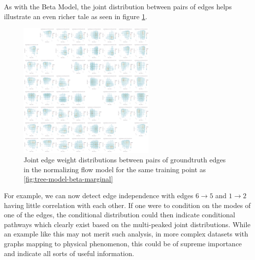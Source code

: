 As with the Beta Model, the joint distribution between pairs of edges helps illustrate an even richer tale as seen in figure \ref{fig:tree-model-dnfg-joint}.
\begin{figure}[htb]
	\centering
	\includegraphics[width=0.6\textwidth]{images/tree-model-dnfg-joint.pdf}
	\caption{Joint edge weight distributions between pairs of groundtruth edges in the normalizing flow model for the same training point as \ref{fig:tree-model-beta-marginal}}
	\label{fig:tree-model-dnfg-joint}
\end{figure}

For example, we can now detect edge independence with edges $6 \rightarrow 5$ and $1 \rightarrow 2$ having little correlation with each other. If one were to condition on the modes of one of the edges, the conditional distribution could then indicate conditional pathways which clearly exist based on the multi-peaked joint distributions. While an example like this may not merit such analysis, in more complex datasets with graphs mapping to physical phenomenon, this could be of supreme importance and indicate all sorts of useful information.

\newpage
